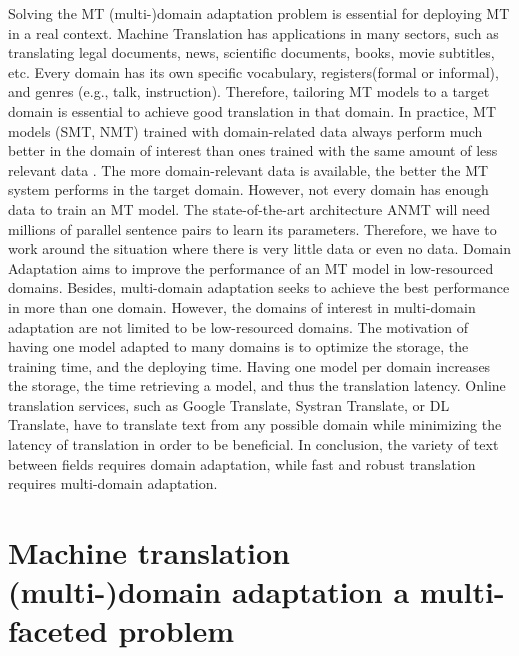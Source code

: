 Solving the MT (multi-)domain adaptation problem is essential for deploying MT in a real context. Machine Translation has applications in many sectors, such as translating legal documents, news, scientific documents, books, movie subtitles, etc. Every domain has its own specific vocabulary, registers(formal or informal), and genres (e.g., talk, instruction). Therefore, tailoring MT models to a target domain is essential to achieve good translation in that domain. In practice, MT models (SMT, NMT) trained with domain-related data always perform much better in the domain of interest than ones trained with the same amount of less relevant data \citep{Rico13domain, Saunders21Domain}. The more domain-relevant data is available, the better the MT system performs in the target domain. However, not every domain has enough data to train an MT model. The state-of-the-art architecture ANMT will need millions of parallel sentence pairs to learn its parameters. Therefore, we have to work around the situation where there is very little data or even no data. Domain Adaptation aims to improve the performance of an MT model in low-resourced domains. Besides, multi-domain adaptation seeks to achieve the best performance in more than one domain. However, the domains of interest in multi-domain adaptation are not limited to be low-resourced domains. The motivation of having one model adapted to many domains is to optimize the storage, the training time, and the deploying time. Having one model per domain increases the storage, the time retrieving a model, and thus the translation latency. Online translation services, such as Google Translate, Systran Translate, or DL Translate, have to translate text from any possible domain while minimizing the latency of translation in order to be beneficial. In conclusion, the variety of text between fields requires domain adaptation, while fast and robust translation requires multi-domain adaptation.

\section{Machine translation (multi-)domain adaptation a multi-faceted problem}
\label{sec:multi-facet}
